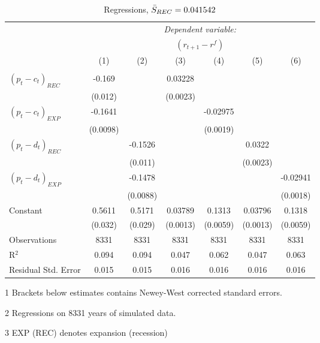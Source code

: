\begin{table}[H]
\centering   
  \caption{Regressions, $\Bar{S}_{REC} = 0.041542$}           
  \label{tab:regress1}     
  \begin{threeparttable}
\begin{tabular}{@{\hspace{5pt}}l@{\hspace{5pt}}cccccc} 
\toprule 
 & \multicolumn{6}{c}{\textit{Dependent variable:}} \\ 
 & \multicolumn{6}{c}{$\left(r_{t+1}-r^f\right)$} \\ 
 \cmidrule(rr){2-7}
 & (1) & (2) & (3) & (4) & (5) & (6) \\ 
\midrule  
\\[-2.1ex] $\left( p_t - c_t \right)_{REC}$ &-0.169& &0.03228 & & &\\ 
  & (0.012) & &(0.0023) & & & \\ 
 \addlinespace 
  $\left( p_t - c_t \right)_{EXP}$ &-0.1641  &    & &-0.02975 & &  \\ 
  & (0.0098) & & &(0.0019) & & \\ 
 \addlinespace 
  $\left( p_t - d_t \right)_{REC}$ & &-0.1526& & & 0.0322  &   \\ 
                                   & &  (0.011) & & & (0.0023) &    \\ 
 \addlinespace 
  $\left( p_t - d_t \right)_{EXP}$ & &   -0.1478& & & &-0.02941 \\ 
                                   & &  (0.0088) & & & &(0.0018) \\ 
 \addlinespace 
 Constant &0.5611 &0.5171&0.03789 &0.1313 &0.03796 &0.1318 \\ 
          &(0.032) &(0.029)&(0.0013)&(0.0059)&(0.0013)&(0.0059) \\ 
 \addlinespace 
\midrule  
Observations & 8331 & 8331&8331 & 8331&8331&8331\\
R$^{2}$ &0.094 & 0.094&0.047&0.062&0.047&0.063 \\ 
Residual Std. Error &0.015 & 0.015&0.016&0.016&0.016&0.016 \\ 
\bottomrule 
\end{tabular} 
\begin{tablenotes}
\footnotesize{
\item[1] Brackets below estimates contains Newey-West corrected standard errors. 
\item[2] Regressions on 8331 years of simulated data.
\item[3] EXP (REC) denotes expansion (recession)
}
\end{tablenotes}
\end{threeparttable}
\end{table} 
